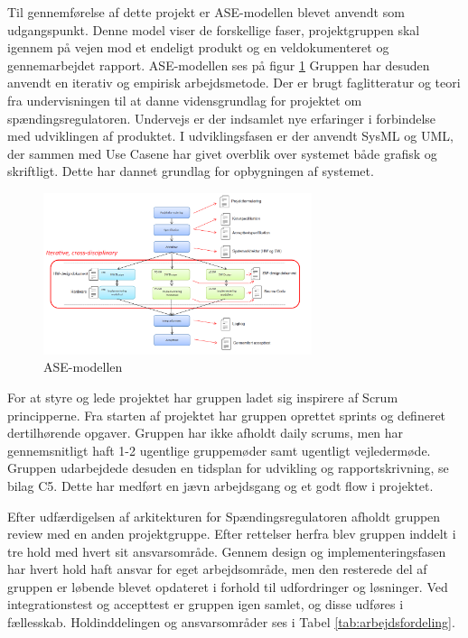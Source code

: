 
Til gennemførelse af dette projekt er ASE-modellen blevet anvendt som udgangspunkt. Denne model viser de forskellige faser, projektgruppen skal igennem på vejen mod et endeligt produkt og en veldokumenteret og gennemarbejdet rapport. ASE-modellen ses på figur \ref{fig:Asemodel} Gruppen har desuden anvendt en iterativ og empirisk arbejdsmetode. Der er brugt faglitteratur og teori fra undervisningen til at danne vidensgrundlag for projektet om spændingsregulatoren. Undervejs er der indsamlet nye erfaringer i forbindelse med udviklingen af produktet. 
I udviklingsfasen er der anvendt SysML og UML, der sammen med Use Casene har givet overblik over systemet både grafisk og skriftligt. Dette har dannet grundlag for opbygningen af systemet. 

\begin{figure}[H] 
	\centering
	\includegraphics[width=0.7\textwidth]{figure/Asemodel}
	\caption{ASE-modellen}
	\label{fig:Asemodel}
\end{figure}

For at styre og lede projektet har gruppen ladet sig inspirere af Scrum principperne. Fra starten af projektet har gruppen oprettet sprints og defineret dertilhørende opgaver. Gruppen har ikke afholdt daily scrums, men har gennemsnitligt haft 1-2 ugentlige gruppemøder samt ugentligt vejledermøde. Gruppen udarbejdede desuden en tidsplan for udvikling og rapportskrivning, se bilag C5. Dette har medført en jævn arbejdsgang og et godt flow i projektet. \newline

Efter udfærdigelsen af arkitekturen for Spændingsregulatoren afholdt gruppen review med en anden projektgruppe. Efter rettelser herfra blev gruppen inddelt i tre hold med hvert sit ansvarsområde. Gennem design og implementeringsfasen har hvert hold haft ansvar for eget arbejdsområde, men den resterede del af gruppen er løbende blevet opdateret i forhold til udfordringer og løsninger. 
Ved integrationstest og accepttest er gruppen igen samlet, og disse udføres i fællesskab. 
Holdinddelingen og ansvarsområder ses i Tabel \ref{tab:arbejdsfordeling}.

